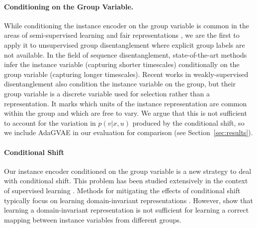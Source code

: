\documentclass{article} %
\begin{document}
\paragraph{Conditioning on the Group Variable.} While conditioning the instance encoder on the group variable is common in the areas of semi-supervised learning and fair representations \citep{Kingma2014Semisupervised, Louizos2016TheVF}, we are the first to apply it to unsupervised group disentanglement where explicit group labels are not available. In the field of sequence disentanglement, state-of-the-art methods \citep{Hsu2017UnsupervisedLO, Denton2017UnsupervisedLO, Li2018DisentangledSA} infer the instance variable (capturing shorter timescales) conditionally on the group variable (capturing longer timescales). Recent works in weakly-supervised disentanglement \citep{Shu2020Weakly, Locatello2019ChallengingCA, Roeder2019Efficient} also condition the instance variable on the group, but their group variable is a discrete variable used for selection rather than a representation. It marks which units of the instance representation are common within the group and which are free to vary. We argue that this is not sufficient to account for the variation in $p(v | x, u)$ produced by the conditional shift, so we include AdaGVAE \citep{Locatello2020WeaklySupervisedDW} in our evaluation for comparison (see Section~\ref{sec:results}).

\paragraph{Conditional Shift} Our instance encoder conditioned on the group variable is a new strategy to deal with conditional shift. This problem has been studied extensively in the context of supervised learning \citep{Zhang2013DomainAU, Gong2016Domain}. Methods for mitigating the effects of conditional shift typically focus on learning domain-invariant representations \citep{BenDavid2009A}. However, \citet{Zhao2019On} show that learning a domain-invariant representation is not sufficient for learning a correct mapping between instance variables from different groups.
\end{document}
